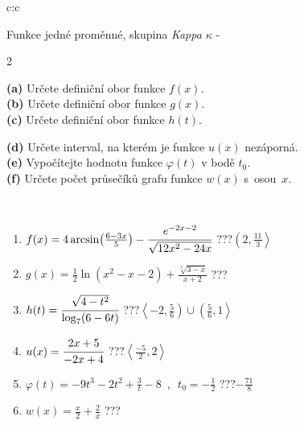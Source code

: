 \documentclass[10pt]{report}
\begin{document}
\begin{tabular}{c:c}
\begin{minipage}[c][104.5mm][t]{0.5\linewidth}
\begin{center}
\vspace{7mm}
{\huge Funkce jedné proměnné, skupina \textit{Kappa $\kappa$} -}\\[5mm]
\begin{minipage}{0.95\linewidth}
\begin{center}
{\small \begin{multicols}{2} \raggedright
\textbf{(a)} Určete definiční obor funkce \(f(x)\). \\[1mm]
\textbf{(b)} Určete definiční obor funkce \(g(x)\). \\[1mm]
\textbf{(c)} Určete definiční obor funkce \(h(t)\). \par \columnbreak
\textbf{(d)} Určete interval, na kterém je funkce \(u(x)\) nezáporná. \\[1mm]
\textbf{(e)} Vypočítejte hodnotu funkce \(\varphi(t)\) v bodě \(t_0\). \\[1mm]
\textbf{(f)} Určete počet průsečíků grafu funkce \(w(x)\) s~osou~\(x\). \\[1mm]
\end{multicols}
}
\end{center}
\end{minipage}
\\[4mm]
\begin{minipage}{0.79\linewidth}
\begin{center}
\begin{varwidth}{\linewidth}
\begin{enumerate}
\small
\item $f(x) = 4\arcsin\!\left( \frac{6-3x}{5} \right) - \cfrac{e^{-2x-2}}{\sqrt{12x^2-24x}}$\quad \dotfill\; ???\;\dotfill \quad $\left(2 , \frac{11}{3}\right\rangle$
\item $g(x) = \frac{1}{2} \ln{\!(x^2-x-2)}+\frac{\sqrt[3]{3-x}}{x+2}$\quad \dotfill\; ???\;\dotfill {}
\item $h(t) = \cfrac{\sqrt{4-t^2}}{\log_7(6-6t)}$\quad \dotfill\; ???\;\dotfill \quad $\left\langle-2 , \frac{5}{6}\right)\cup\left(\frac{5}{6} , 1\right\rangle$
\item $u(x) = \cfrac{2x+5}{-2x+4}$\quad \dotfill\; ???\;\dotfill \quad $\left\langle\frac{-5}{2} , 2\right\rangle$
\item $\varphi(t) = -9t^3-2t^2+\frac{3}{t}-8 \enspace , \enspace t_0=-\frac{1}{2}$\quad \dotfill\; ???\;\dotfill \quad $-\frac{71}{8}$
\item $w(x) = \frac{x}{2}+\frac{2}{x}$\quad \dotfill\; ???\;\dotfill {}

\end{enumerate}
\end{varwidth}
\end{center}
\end{minipage}
\end{center}
\end{minipage}
\end{tabular}
\end{document}
